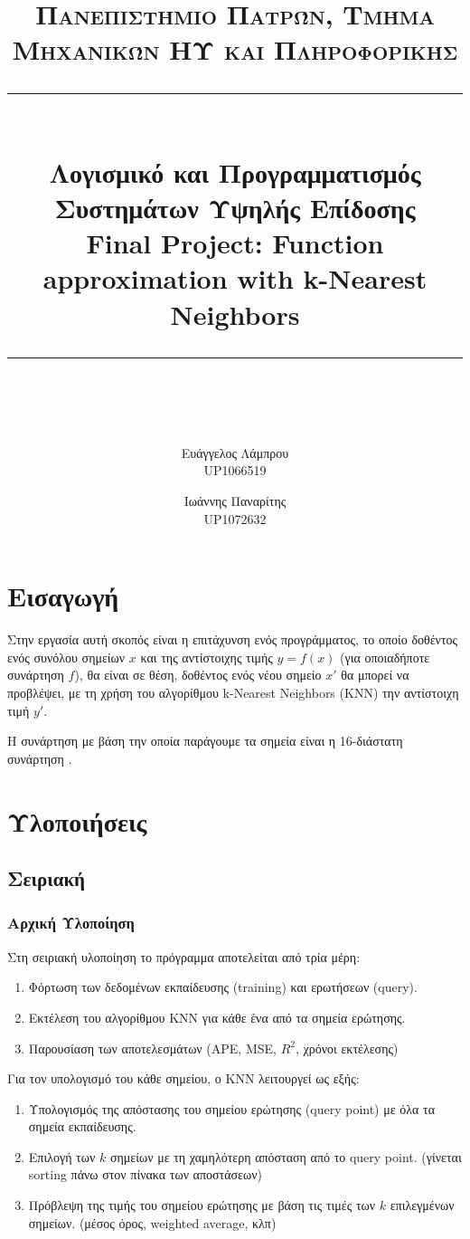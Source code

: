 \documentclass[11pt]{scrartcl} %
\title{	
	\normalfont\normalsize
	\textsc{Πανεπιστήμιο Πατρών, Τμήμα Μηχανικών ΗΥ και Πληροφορικής}\\ %
	\vspace{25pt} %
	\rule{\linewidth}{0.5pt}\\ %
	\vspace{20pt} %
    {\Large Λογισμικό και Προγραμματισμός Συστημάτων Υψηλής Επίδοσης \\ \textbf{Final Project:} Function approximation with k-Nearest Neighbors}\\ %
	\vspace{12pt} %
	\rule{\linewidth}{2pt}\\ %
	\vspace{12pt} %
}
\author{Ευάγγελος Λάμπρου \\UP1066519 \and Ιωάννης Παναρίτης \\UP1072632} %
\date{} %
\begin{document}
\maketitle 


\section{Εισαγωγή}

Στην εργασία αυτή σκοπός είναι η επιτάχυνση ενός προγράμματος, το οποίο
δοθέντος ενός συνόλου σημείων $x$ και της αντίστοιχης τιμής $y = f(x)$ (για οποιαδήποτε συνάρτηση $f$), 
θα είναι σε θέση, δοθέντος ενός νέου σημείο $x'$ θα μπορεί να προβλέψει, με τη χρήση του αλγορίθμου 
k-Nearest Neighbors (KNN) την αντίστοιχη τιμή $y'$.

Η συνάρτηση με βάση την οποία παράγουμε τα σημεία είναι η 16-διάστατη συνάρτηση .

\section{Υλοποιήσεις}

\subsection{Σειριακή}

\subsubsection{Αρχική Υλοποίηση}

Στη σειριακή υλοποίηση το πρόγραμμα αποτελείται από τρία μέρη: 

\begin{enumerate}
    \item Φόρτωση των δεδομένων εκπαίδευσης (training) και ερωτήσεων (query).
    \item Εκτέλεση του αλγορίθμου KNN για κάθε ένα από τα σημεία ερώτησης.
    \item Παρουσίαση των αποτελεσμάτων (APE, MSE, $R^2$, χρόνοι εκτέλεσης)
\end{enumerate}

Για τον υπολογισμό του κάθε σημείου, ο KNN λειτουργεί ως εξής:

\begin{enumerate}
    \item Υπολογισμός της απόστασης του σημείου ερώτησης (query point) με όλα τα σημεία εκπαίδευσης.
    \item Επιλογή των $k$ σημείων με τη χαμηλότερη απόσταση από το query point. (γίνεται sorting πάνω στον πίνακα των αποστάσεων)
    \item Πρόβλεψη της τιμής του σημείου ερώτησης με βάση τις τιμές των $k$ επιλεγμένων σημείων. (μέσος όρος, weighted average, κλπ)
\end{enumerate}
\end{document}
